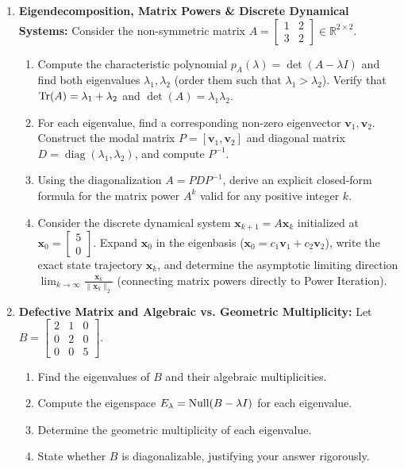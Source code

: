 \begin{enumerate}[label=\textbf{P\arabic*.}]
    \item \textbf{Eigendecomposition, Matrix Powers \& Discrete Dynamical Systems:}
    Consider the non-symmetric matrix $A = \begin{bmatrix} 1 & 2 \\ 3 & 2 \end{bmatrix} \in \mathbb{R}^{2 \times 2}$.
    \begin{enumerate}[label=(\alph*)]
        \item Compute the characteristic polynomial $p_A(\lambda) = \det(A - \lambda I)$ and find both eigenvalues $\lambda_1, \lambda_2$ (order them such that $\lambda_1 > \lambda_2$). Verify that $\operatorname{Tr}(A) = \lambda_1 + \lambda_2$ and $\det(A) = \lambda_1 \lambda_2$.
        \item For each eigenvalue, find a corresponding non-zero eigenvector $\mathbf{v}_1, \mathbf{v}_2$. Construct the modal matrix $P = [\mathbf{v}_1, \mathbf{v}_2]$ and diagonal matrix $D = \operatorname{diag}(\lambda_1, \lambda_2)$, and compute $P^{-1}$.
        \item Using the diagonalization $A = P D P^{-1}$, derive an explicit closed-form formula for the matrix power $A^k$ valid for any positive integer $k$.
        \item Consider the discrete dynamical system $\mathbf{x}_{k+1} = A \mathbf{x}_k$ initialized at $\mathbf{x}_0 = \begin{bmatrix} 5 \\ 0 \end{bmatrix}$. Expand $\mathbf{x}_0$ in the eigenbasis ($\mathbf{x}_0 = c_1 \mathbf{v}_1 + c_2 \mathbf{v}_2$), write the exact state trajectory $\mathbf{x}_k$, and determine the asymptotic limiting direction $\lim_{k \to \infty} \frac{\mathbf{x}_k}{\|\mathbf{x}_k\|_2}$ (connecting matrix powers directly to Power Iteration).
    \end{enumerate}

    \item \textbf{Defective Matrix and Algebraic vs. Geometric Multiplicity:}
    Let $B = \begin{bmatrix} 2 & 1 & 0 \\ 0 & 2 & 0 \\ 0 & 0 & 5 \end{bmatrix}$.
    \begin{enumerate}[label=(\alph*)]
        \item Find the eigenvalues of $B$ and their algebraic multiplicities.
        \item Compute the eigenspace $E_\lambda = \operatorname{Null}(B - \lambda I)$ for each eigenvalue.
        \item Determine the geometric multiplicity of each eigenvalue.
        \item State whether $B$ is diagonalizable, justifying your answer rigorously.
    \end{enumerate}


\end{enumerate}
